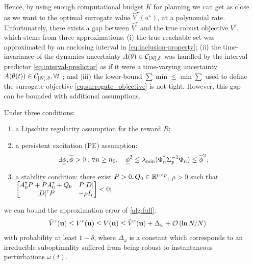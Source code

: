 Hence, by using enough computational budget $K$ for planning we can get as close as we want to the optimal surrogate value $\hat{V}^r(a^{\star})$, at a polynomial rate. Unfortunately, there exists a gap between $\hat{V}^r$ and the true robust objective $V^r$, which stems from three approximations: (i) the true reachable set was approximated by an enclosing interval in \eqref{eq:inclusion-property}; (ii) the time-invariance of the dynamics uncertainty $A(\theta)\in\mathcal{C}_{[N],\delta}$ was handled by the interval predictor \eqref{eq:interval-predictor} as if it were a time-varying uncertainty $A(\theta(t))\in\mathcal{C}_{[N],\delta},\forall t$ ; and (iii) the lower-bound $\sum\min\leq \min\sum$ used to define the surrogate objective \eqref{eq:surrogate_objective} is not tight. However, this gap can be bounded with additional assumptions.

\begin{theorem}
	\label{thm:control-error}
	\begin{leftbar}[theorembar]
	Under three conditions:
	\begin{enumerate}
		\item a Lipschitz regularity assumption for the reward $R$;
		\item a persistent excitation (PE) assumption:
		\begin{align*}
		\exists \underline{\phi},\overline{\phi}>0: \forall n\geq n_0,\quad \underline{\phi}^2 \leq \lambda_{\min}(\Phi_{n}^{\mathsf{\scriptscriptstyle T}}\Sigma_{p}^{-1}\Phi_{n}) \leq \overline{\phi}^2;
		\end{align*}
		\item a stability condition: there exist $P>0,Q_0\in\mathbb{R}^{p\times p}$, $\rho>0$ such that
		$\begin{bmatrix}
		A_0^{\mathsf{\scriptscriptstyle T}} P + P A_0^{\mathsf{\scriptscriptstyle T}} + Q_0 & P|D|  \\
		|D|^{\mathsf{\scriptscriptstyle T}} P & -\rho I_r \\
		\end{bmatrix}< 0;$
	\end{enumerate}
	we can bound the approximation error of \autoref{alg:full}:
	\begin{equation*}
	\hat{V}^r(\mathbf{u}) \leq {V}^r(\mathbf{u}) \leq V(\mathbf{u}) \leq \hat{V}^r(\mathbf{u}) + \Delta_\omega + \mathcal{O}\left({\ln N / N}\right)
	\end{equation*}
	with probability at least $1-\delta$, where $\Delta_\omega$ is a constant which corresponds to an irreducible suboptimality suffered from being robust to instantaneous perturbations $\omega(t)$.
	\end{leftbar}
\end{theorem}


